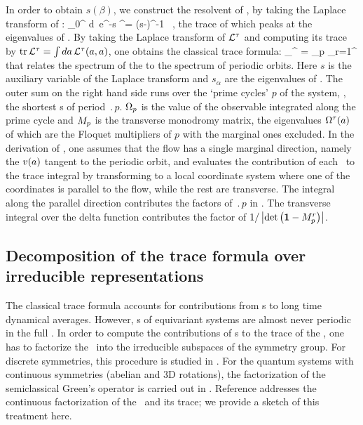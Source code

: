 \documentclass[aip,cha,
reprint,
secnumarabic,
nofootinbib, tightenlines,
nobibnotes, showkeys, showpacs,
superscriptaddress,
]{revtex4-1}
\begin{document}
{In order to obtain $s(\beta)$, we construct the resolvent of \Aop , by taking
the Laplace transform of :
\beq
	\int_0^{\infty} \!d\zeit\, e^{-s\zeit} \Lop^\zeit = (s-\Aop)^{-1} \, ,
	\label{eq-ResolventA}
\eeq
the trace of which peaks at the eigenvalues of \Aop. By taking the
Laplace transform of ${\cal L}^{\tau}$ and computing its trace
by $\mbox{\rm tr}\, {\cal L}^{\tau} = \int da \, {\cal L}^{\tau} (a,a)$, one obtains the
classical trace formula:
\beq
\sum_{}^{\infty}  = \sum_p 
\sum_{r=1}^{\infty} 
that relates the spectrum of the {\evOper} to the spectrum of periodic
orbits. Here  $s$ is the auxiliary
variable of the Laplace transform and $s_{\alpha}$ are the eigenvalues of \Aop . The
outer sum on the right hand side runs over the `prime cycles' $p$ of the system,
\ie, the shortest \po s of period $\period{p}$. $\Omega_p$ is the value of
the observable integrated along the prime cycle and ${M}_p$ is the
transverse monodromy matrix, the eigenvalues $\Omega^{\tau} (a)$ of
which are the Floquet multipliers of $p$ with the marginal ones excluded.
In the derivation of , one assumes that
the flow has a single marginal direction, namely the ${v}(a)$ tangent
to the periodic orbit, and evaluates the contribution of each \po\ to the
trace integral by transforming to a local coordinate system where one of
the coordinates is parallel to the flow, while the rest are transverse.
The integral along the parallel direction contributes the factors of
$\period{p}$ in . The transverse integral
over the delta function  contributes the factor of
$1/\left|\mbox{\rm det}\,\!\left({\bf 1}-{M}_p^{r}\right)\right|$.

\subsection{Decomposition of the trace formula over irreducible representations}
\label{s-ContFac}

The classical trace formula  accounts for contributions from \po s
to long time dynamical averages. However, \rpo s of equivariant systems are almost never
periodic in the full \statesp. In order to compute the contributions of \rpo s
to the trace of the \evOper, one has to factorize
the \evOper\
into the irreducible subspaces of the symmetry group. For discrete symmetries,
this procedure is studied in \refref{CvitaEckardt}. For the quantum systems
with continuous symmetries (abelian and 3D rotations), the factorization of
the semiclassical Green's operator is carried out in \refref{Creagh93}.
Reference \cite{Cvi07} addresses the continuous factorization of the \evOper\ and its
trace; we provide a sketch of this treatment here. 

}
\end{document}
